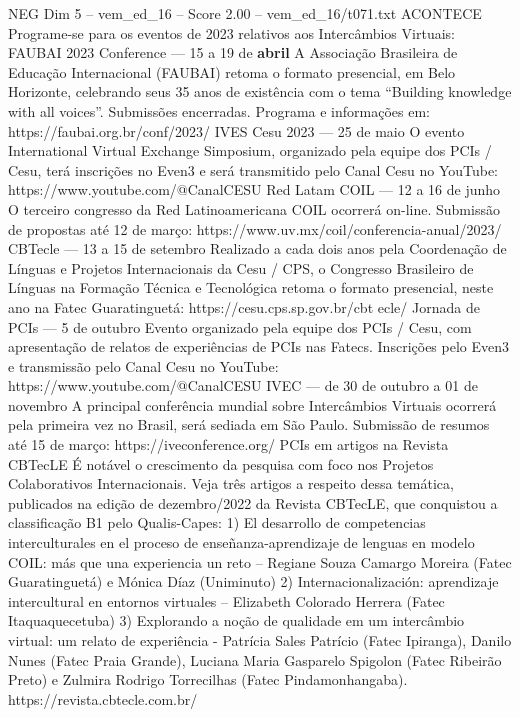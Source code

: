 \begin{textsample}{NEG Dim 5 – vem\_ed\_16 – Score 2.00 – vem\_ed\_16/t071.txt}  \label{ex:f5_neg_116}
ACONTECE Programe-se para os eventos de 2023 relativos aos Intercâmbios Virtuais: FAUBAI 2023 Conference — 15 a 19 de \textbf{abril} A Associação Brasileira de Educação Internacional (FAUBAI) retoma o formato presencial, em Belo Horizonte, celebrando seus 35 anos de existência com o tema “Building knowledge with all voices”.
Submissões encerradas.
Programa e informações em: https://faubai.org.br/conf/2023/ IVES Cesu 2023 — 25 de maio O evento International Virtual Exchange Simposium, organizado pela equipe dos PCIs / Cesu, terá inscrições no Even3 e será transmitido pelo Canal Cesu no YouTube: https://www.youtube.com/@CanalCESU Red Latam COIL — 12 a 16 de junho O terceiro congresso da Red Latinoamericana COIL ocorrerá on-line.
Submissão de propostas até 12 de março: https://www.uv.mx/coil/conferencia-anual/2023/ CBTecle — 13 a 15 de setembro Realizado a cada dois anos pela Coordenação de Línguas e Projetos Internacionais da Cesu / CPS, o Congresso Brasileiro de Línguas na Formação Técnica e Tecnológica retoma o formato presencial, neste ano na Fatec Guaratinguetá: https://cesu.cps.sp.gov.br/cbt ecle/ Jornada de PCIs — 5 de outubro Evento organizado pela equipe dos PCIs / Cesu, com apresentação de relatos de experiências de PCIs nas Fatecs.
Inscrições pelo Even3 e transmissão pelo Canal Cesu no YouTube: https://www.youtube.com/@CanalCESU IVEC — de 30 de outubro a 01 de novembro A principal conferência mundial sobre Intercâmbios Virtuais ocorrerá pela primeira vez no Brasil, será sediada em São Paulo.
Submissão de resumos até 15 de março: https://iveconference.org/ PCIs em artigos na Revista CBTecLE É notável o crescimento da pesquisa com foco nos Projetos Colaborativos Internacionais.
Veja três artigos a respeito dessa temática, publicados na edição de dezembro/2022 da Revista CBTecLE, que conquistou a classificação B1 pelo Qualis-Capes: 1) El desarrollo de competencias interculturales en el proceso de enseñanza-aprendizaje de lenguas en modelo COIL: más que una experiencia un reto – Regiane Souza Camargo Moreira (Fatec Guaratinguetá) e Mónica Díaz (Uniminuto) 2) Internacionalización: aprendizaje intercultural en entornos virtuales – Elizabeth Colorado Herrera (Fatec Itaquaquecetuba) 3) Explorando a noção de qualidade em um intercâmbio virtual: um relato de experiência - Patrícia Sales Patrício (Fatec Ipiranga), Danilo Nunes (Fatec Praia Grande), Luciana Maria Gasparelo Spigolon (Fatec Ribeirão Preto) e Zulmira Rodrigo Torrecilhas (Fatec Pindamonhangaba). https://revista.cbtecle.com.br/

\end{textsample}
